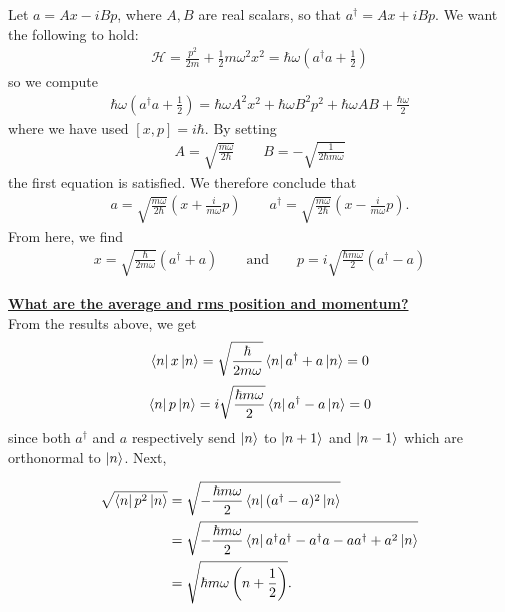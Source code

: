 \documentclass{book}
\theoremstyle{definition}
\newcommand{\ham}{\mathcal{H}}
\newcommand{\f}[2]{\frac{#1}{#2}}
\newcommand{\lp}{\left(}
\newcommand{\rp}{\right)}
\begin{document}
Let $a = A  x - i B  p$, where $A,B$ are real scalars, so that $ a^\dagger = A x+ i B  p$. We want the following to hold:
\begin{align*}
\ham = \f{p^2 }{2m} + \f{1}{2}m\omega^2 x^2 = \hbar \omega \lp a^\dagger a + \f{1}{2} \rp
\end{align*}
so we compute
\begin{align*}
\hbar \omega \lp a^\dagger a+ \f{1}{2}\rp = \hbar \omega A^2 x^2 + \hbar \omega B^2 p^2 + \hbar \omega AB + \f{\hbar \omega}{2}
\end{align*}
where we have used $[x,p] = i\hbar $. By setting 
\begin{align*}
A = \sqrt{\f{m\omega}{2\hbar}} \quad\quad B = -\sqrt{\f{1}{2\hbar m\omega}}
\end{align*}
the first equation is satisfied. We therefore conclude that
\begin{align*}
a = \sqrt{\f{m\omega}{2\hbar}} \lp x + \f{i}{m\omega} p \rp \quad\quad a^\dagger = \sqrt{\f{m\omega}{2\hbar}} \lp x - \f{i}{m\omega} p \rp.
\end{align*}
From here, we find 
\begin{align*}
\boxed{x = \sqrt{\f{\hbar}{2 m\omega}}(a^\dagger + a) \quad\quad\text{and}\quad\quad p = i\sqrt{\f{\hbar m\omega }{2}}(a^\dagger - a)}
\end{align*}




\noindent \textbf{\underline{What are the average and rms position and momentum?}}\\


From the results above, we get
\begin{align*}
\bra{n} x \ket{n} = \sqrt{\f{\hbar}{2 m\omega}}\bra{n} a^\dagger + a \ket{n} = 0
\end{align*}
\begin{align*}
\bra{n} p \ket{n} = i\sqrt{\f{\hbar m\omega }{2}}\bra{n} a^\dagger - a \ket{n} = 0
\end{align*}
since both $a^\dagger$ and $a$ respectively send $\ket{n}$ to $\ket{n+1}$ and $\ket{n-1}$ which are orthonormal to $\ket{n}$. Next, 


\begin{align*}
\sqrt{\bra{n}p^2 \ket{n}} &= \sqrt{-\f{\hbar m\omega}{2}\bra{n} (a^\dagger - a)^2 \ket{n} }\\
&= \sqrt{-\f{\hbar m\omega}{2} \bra{n} a^\dagger a^\dagger -a^\dagger a - aa^\dagger + a^2 \ket{n} }\\
&= \sqrt{\hbar m\omega \lp n+ \f{1}{2} \rp}.
\end{align*}
\end{document}

